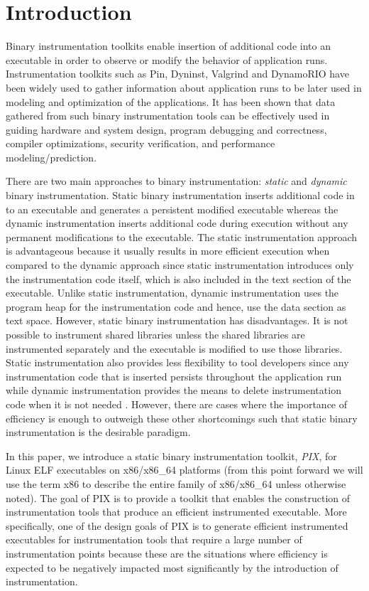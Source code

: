 \section{Introduction}

Binary instrumentation toolkits enable insertion of additional code into an
executable in order to observe or modify the behavior of application runs. 
Instrumentation toolkits such as Pin\cite{luk2005pin}, Dyninst\cite{buck2000api}, 
Valgrind\cite{nethercote2007valgrind} and DynamoRIO\cite{bruening2004efficient} have been widely used to gather information about
application runs to be later used in modeling and optimization
of the applications. It has been shown that data gathered 
from such binary instrumentation tools can be effectively used in guiding hardware and
system design, program debugging and correctness, compiler optimizations, security verification,
and performance modeling/prediction\cite{snavely2001modeling}.

There are two main approaches to binary instrumentation: \textit{static} 
and \textit{dynamic} binary instrumentation. Static binary
instrumentation inserts additional code in to an executable and generates a persistent
modified executable whereas the dynamic instrumentation inserts additional code 
during execution without any permanent modifications to the executable.
The static instrumentation approach is advantageous because it usually results in more
efficient execution when compared to the dynamic approach
since static instrumentation introduces only the instrumentation code itself, 
which is also included in the text section of the executable. 
Unlike static instrumentation, dynamic
instrumentation uses the program heap for the instrumentation code and hence, use the data section as text space.
However, static binary instrumentation has disadvantages. It is not possible to instrument shared libraries 
unless the shared libraries are instrumented separately and the executable is modified to use those libraries. 
Static instrumentation also provides less flexibility to tool developers since any instrumentation code that is
inserted persists throughout the application run while dynamic instrumentation 
provides the means to delete instrumentation code when it is not needed \cite{tikir2002efficient}.
However, there are cases where the importance of efficiency is enough to outweigh
these other shortcomings \cite{carrington2006performance} such that static binary instrumentation is the
desirable paradigm. 

In this paper, we introduce a static binary instrumentation toolkit, \textit{PIX}, for Linux ELF executables on
x86/x86\_64 platforms (from this point forward we will use the term x86 to describe the entire family
of x86/x86\_64 unless otherwise noted). The goal of PIX is to provide a toolkit that enables the construction of
instrumentation tools that produce an efficient instrumented
executable. More specifically, one of the design goals of PIX is to generate efficient instrumented executables
for instrumentation tools that require a large number of instrumentation points because these are the situations 
where efficiency is expected to be negatively impacted most significantly by the introduction of instrumentation. 

